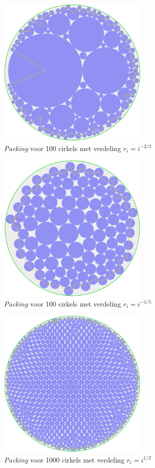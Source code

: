 \documentclass[12pt,a4paper,oneside]{book}
\begin{document}
\begin{figure}
  \centering
  \includegraphics[width=0.65\textwidth]{packing-neg2div3-100.png}
  \caption{\textit{Packing} voor 100 cirkels met verdeling $r_i=i^{-2/3}$}
\end{figure}

\begin{figure}
  \centering
  \includegraphics[width=0.65\textwidth]{packing-neg1div5-100.png}
  \caption{\textit{Packing} voor 100 cirkels met verdeling $r_i=i^{-1/5}$}
\end{figure}

\begin{figure}
  \centering
  \includegraphics[width=0.65\textwidth]{packing-1div2-1000.png}
  \caption{\textit{Packing} voor 1000 cirkels met verdeling $r_i=i^{1/2}$}
\end{figure}
\end{document}
